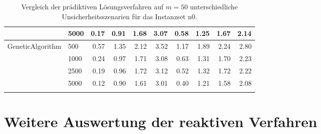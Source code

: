 {\begin{longtable}{ll|rrrr|rrrr}
                 & 5000 & 0.17 & 0.91 & 1.68 & 3.07 & 0.58 & 1.25 & 1.67 & 2.14 \\ \hline
GeneticAlgorithm & 500  & 0.57 & 1.35 & 2.12 & 3.52 & 1.17 & 1.89 & 2.24 & 2.80 \\
                 & 1000 & 0.24 & 0.97 & 1.71 & 3.08 & 0.63 & 1.31 & 1.70 & 2.23 \\
                 & 2500 & 0.19 & 0.96 & 1.72 & 3.12 & 0.52 & 1.32 & 1.72 & 2.22 \\
                 & 5000 & 0.12 & 0.90 & 1.61 & 3.01 & 0.40 & 1.21 & 1.58 & 2.08 \\
\bottomrule
\caption{Vergleich der prädiktiven Lösungsverfahren auf $m=50$ unterschiedliche Unsicherheitsszenarien für das Instanzset n0. }
\label{tab:evaluation_predictive_n0}
\end{longtable}
}
\vspace*{-25px}
\begin{figure}[H]
\end{figure}

\newpage
\section{Weitere Auswertung der reaktiven Verfahren}
\label{sec:WeitereAuswertung_ProaktivReaktiv}

